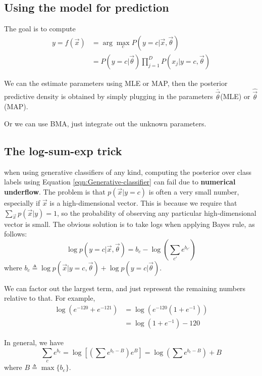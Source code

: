 \begin{refsection}
\subsection{Using the model for prediction}
The goal is to compute
\begin{equation}\begin{split}
y=f(\vec{x}) & =\arg\max\limits_{c}{P(y=c|\vec{x},\vec{\theta})} \\
& =P(y=c|\vec{\theta})\prod_{j=1}^D P(x_j|y=c,\vec{\theta})
\end{split}\end{equation}

We can the estimate parameters using MLE or MAP, then the posterior predictive density is obtained by simply plugging in the parameters $\bar{\vec{\theta}}$(MLE) or $\hat{\vec{\theta}}$(MAP). 

Or we can use BMA, just integrate out the unknown parameters.


\subsection{The log-sum-exp trick}
when using generative classifiers of any kind, computing the posterior over class labels using Equation \ref{eqn:Generative-classifier} can fail due to \textbf{numerical underflow}. The problem is that $p(\vec{x}|y=c)$ is often a very small number, especially if $\vec{x}$ is a high-dimensional vector. This is because we require that $\sum_{\vec{x}}p(\vec{x}|y)=1$, so the probability of observing any particular high-dimensional vector is small. The obvious solution is to take logs when applying Bayes rule, as follows:
\begin{equation}
\log p(y=c|\vec{x},\vec{\theta})=b_c-\log\left(\sum\limits_{c'}e^{b_{c'}}\right)
\end{equation}
where $b_c \triangleq \log p(\vec{x}|y=c,\vec{\theta})+\log p(y=c|\vec{\theta})$.

We can factor out the largest term, and just represent the remaining numbers relative to that. For example,
\begin{equation}\begin{split}
\log(e^{-120}+e^{-121}) & =\log(e^{-120}(1+e^{-1})) \\
& =\log(1+e^{-1})-120
\end{split}\end{equation}

In general, we have
\begin{equation}
\sum\limits_{c}e^{b_{c}}=\log\left[(\sum e^{b_c-B})e^B\right]=\log\left(\sum e^{b_c-B}\right)+B
\end{equation}
where $B \triangleq \max\{b_c\}$.


\end{refsection}
